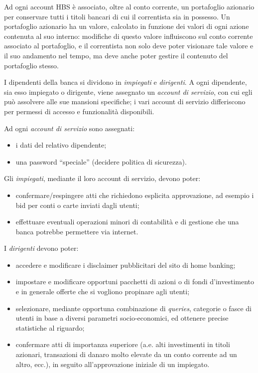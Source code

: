 Ad ogni account HBS è associato, oltre al conto corrente, un portafoglio azionario per conservare tutti i titoli bancari di cui il correntista sia in possesso.
Un portafoglio azionario ha un valore, calcolato in funzione dei valori di ogni azione contenuta al suo interno: modifiche di questo valore influiscono sul conto corrente associato al portafoglio, e il correntista non solo deve poter visionare tale valore e il suo andamento nel tempo, ma deve anche poter gestire il contenuto del portafoglio stesso.

I dipendenti della banca si dividono in \emph{impiegati} e \emph{dirigenti}. A ogni dipendente, sia esso impiegato o dirigente, viene assegnato un \emph{account di servizio}, con cui egli può assolvere alle sue mansioni specifiche; i vari account di servizio differiscono per permessi di accesso e funzionalità disponibili.

Ad ogni \emph{account di servizio} sono assegnati:
\begin{itemize}
	\item i dati del relativo dipendente;
	\item una password ``speciale'' (decidere politica di sicurezza).
\end{itemize}	

Gli \emph{impiegati}, mediante il loro account di servizio, devono poter: 
\begin{itemize}
	\item confermare/respingere atti che richiedono esplicita approvazione, ad esempio i bid per conti o carte inviati dagli utenti; 
	\item effettuare eventuali operazioni minori di contabilità e di gestione che una banca potrebbe permettere via internet.
\end{itemize}

I \emph{dirigenti} devono poter:
\begin{itemize}
	\item accedere e modificare i disclaimer pubblicitari del sito di home banking;
	\item impostare e modificare opportuni pacchetti di azioni o di fondi d'investimento e in generale offerte che si vogliono propinare agli utenti;
	\item selezionare, mediante opportuna combinazione di \emph{queries}, categorie o fasce di utenti in base a diversi parametri socio-economici, ed ottenere precise statistiche al riguardo;
	\item confermare atti di importanza superiore (a.e. alti investimenti in titoli azionari, transazioni di danaro molto elevate da un conto corrente ad un altro, ecc.), in seguito all'approvazione iniziale di un impiegato.
\end{itemize}


